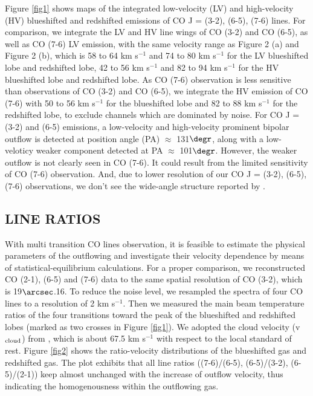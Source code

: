 Figure \ref{fig1} shows maps of the integrated low-velocity (LV) and high-velocity (HV) blueshifted and redshifted emissions of CO J = (3-2), (6-5), (7-6) lines. For comparison, we integrate the LV and HV line wings of CO (3-2) and CO (6-5), as well as CO (7-6) LV emission, with the same velocity range as \citet{2009ApJ...696...66Q} Figure 2 (a) and Figure 2 (b), which is 58 to 64 km s$^{-1} $ and 74 to 80 km s$^{-1}$ for the LV blueshifted lobe and redshifted lobe, 42 to 56 km s$^{-1} $ and 82 to 94 km s$^{-1}$ for the HV blueshifted lobe and redshifted lobe. As CO (7-6) observation is less sensitive than observations of CO (3-2) and CO (6-5), we integrate the HV emission of CO (7-6) with 50 to 56 km s$^{-1} $ for the blueshifted lobe and 82 to 88 km s$^{-1}$ for the redshifted lobe, to exclude channels which are dominated by noise. 
For CO J = (3-2) and (6-5) emissions, a low-velocity and high-velocity prominent bipolar outflow is detected at position angle (PA) $\approx$ 131${\degr}$, along with a low-veloticy weaker component detected at PA $\approx$ 101${\degr}$. However, the weaker outflow is not clearly seen in CO (7-6). It could result from the limited sensitivity of CO (7-6) observation. And, due to lower resolution of our CO J = (3-2), (6-5), (7-6) observations, we don't see the wide-angle structure reported by \citet{2009ApJ...696...66Q}.

\subsection{LINE RATIOS}
With multi transition CO lines observation, it is feasible to estimate the physical parameters of the outflowing and investigate their velocity dependence by means of statistical-equilibrium calculations. For a proper comparison, we reconstructed CO (2-1), (6-5) and (7-6) data to the same spatial resolution of CO (3-2), which is 19${\arcsec}$.16. To reduce the noise level, we resampled the spectra of four CO lines to a resolution of 2 km s$^{-1}$. Then we measured the main beam temperature ratios of the four transitions toward the peak of the blueshifted and redshifted lobes (marked as two crosses in Figure \ref{fig1}). We adopted the cloud velocity (v$_{\textup{cloud}}$) from \citet{2003A&A...412..175K}, which is about 67.5 km s$^{-1}$ with respect to the local standard of rest. Figure \ref{fig2} shows the ratio-velocity distributions of the blueshifted gas and redshifted gas. The plot exhibits that all line ratios ((7-6)/(6-5), (6-5)/(3-2), (6-5)/(2-1)) keep almost unchanged with the increase of outflow velocity, thus indicating the homogenousness within the outflowing gas.


